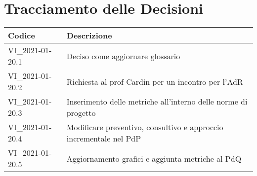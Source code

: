 \section*{Tracciamento delle Decisioni}

\begin{center}
	\begin{longtable}{|p{3.5cm}|p{11cm}|}
		\hline
		\rowcolor{lighter-grayer}
		\textbf{Codice} & \textbf{Descrizione} \\
		\hline
		\endfirsthead

		\hline
		VI\_2021-01-20.1 & Deciso come aggiornare glossario \\
		VI\_2021-01-20.2 & Richiesta al prof Cardin per un incontro per l'AdR\\
		VI\_2021-01-20.3 & Inserimento delle metriche all'interno delle norme di progetto\\
		VI\_2021-01-20.4 & Modificare preventivo, consultivo e approccio incrementale nel PdP \\
		VI\_2021-01-20.5 & Aggiornamento grafici e aggiunta metriche al PdQ\\
		\hline
	\end{longtable}
\end{center}